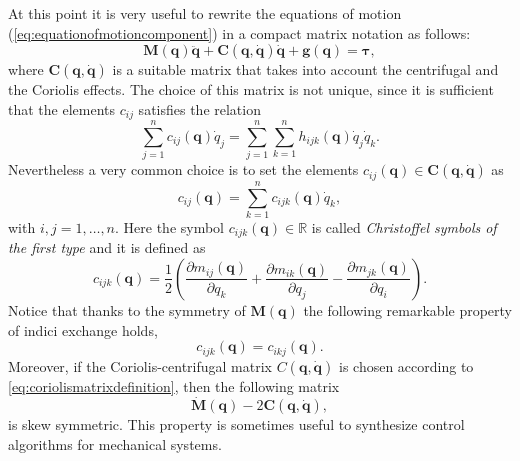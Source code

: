 		At this point it is very useful to rewrite the equations of 
		motion (\ref{eq:equationofmotioncomponent}) in a compact matrix notation as follows:
		\begin{equation}
			\bm{M}(\bm{q})\ddot{\bm{q}} + \bm{C}(\bm{q},\dot{\bm{q}})\dot{\bm{q}} + \bm{g}(\bm{q}) = \bm{\tau},
		\end{equation}
		where $\bm{C}(\bm{q},\dot{\bm{q}})$ is a suitable matrix that 
		takes into account the centrifugal and the Coriolis effects.
		The choice of this matrix is not unique, since it is sufficient 
		that the elements $c_{ij}$ satisfies the relation
		\begin{equation}
			\sum_{j=1}^{n}c_{ij}(\bm{q})\dot{q}_{j}
			= \sum_{j=1}^{n}\sum_{k=1}^{n}h_{ijk}(\bm{q})\dot{q}_{j}\dot{q}_{k}.
		\end{equation}
		Nevertheless a very common choice is to set the elements 
		$c_{ij}(\bm{q})\in\bm{C}(\bm{q},\dot{\bm{q}})$ as
		\begin{equation}
			\label{eq:coriolismatrixdefinition}
			c_{ij}(\bm{q}) = \sum_{k=1}^{n}c_{ijk}(\bm{q})\dot{q}_{k},
		\end{equation}
		with $i,j=1,\dots,n$. Here the symbol $c_{ijk}(\bm{q})\in\mathbb{R}$ is
		called \emph{Christoffel symbols of the first type} and it is defined as
		\begin{equation}
			c_{ijk}(\bm{q}) = \frac{1}{2}
			\left(\frac{\partial m_{ij}(\bm{q})}{\partial q_{k}}+
			\frac{\partial m_{ik}(\bm{q})}{\partial q_{j}}
			-\frac{\partial m_{jk}(\bm{q})}{\partial q_{i}}\right).
		\end{equation}
		Notice that thanks to the symmetry of $\bm{M}(\bm{q})$ 
		the following remarkable property of indici exchange holds,
		\begin{equation}
			c_{ijk}(\bm{q}) = c_{ikj}(\bm{q}).
		\end{equation}
		Moreover, if the Coriolis-centrifugal matrix $C(\bm{q},\dot{\bm{q}})$ 
		is chosen according to \cref{eq:coriolismatrixdefinition}, then the following matrix
		\begin{equation}
			\dot{\bm{M}}(\bm{q})-2\bm{C}(\bm{q},\dot{\bm{q}}),
		\end{equation}
		is skew symmetric.
		This property is sometimes useful to synthesize
		control algorithms for mechanical systems.
		
